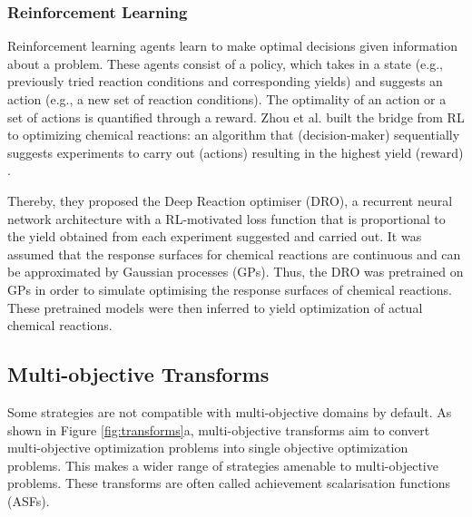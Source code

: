 \subsubsection{Reinforcement Learning}
Reinforcement learning agents learn to make optimal decisions given information about a problem.\cite{sutton2018reinforcement} These agents consist of a policy, which takes in a state (e.g., previously tried reaction conditions and corresponding yields) and suggests an action (e.g., a new set of reaction conditions). The optimality of an action or a set of actions is quantified through a reward. Zhou et al. built the bridge from RL to optimizing chemical reactions: an algorithm that (decision-maker) sequentially suggests experiments to carry out (actions) resulting in the highest yield (reward) \cite{Zhou2017}.

Thereby, they proposed the Deep Reaction optimiser (DRO), a recurrent neural network architecture with a RL-motivated loss function that is proportional to the yield obtained from each experiment suggested and carried out. It was assumed that the response surfaces for chemical reactions are continuous and can be approximated by Gaussian processes (GPs). Thus, the DRO was pretrained on GPs in order to simulate optimising the response surfaces of chemical reactions. These pretrained models were then inferred to yield optimization of actual chemical reactions.

\subsection{Multi-objective Transforms}

Some strategies are not compatible with multi-objective domains by default. As shown in Figure \ref{fig:transforms}a, multi-objective transforms aim to convert multi-objective optimization problems into single objective optimization problems. This makes a wider range of strategies amenable to multi-objective problems. These transforms are often called achievement scalarisation functions (ASFs).

